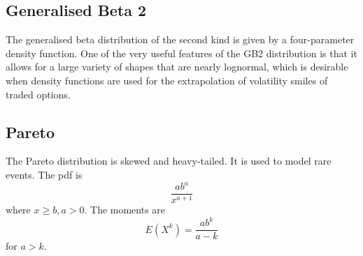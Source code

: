 \subsection{Generalised Beta 2}
The generalised beta distribution of the second kind
is given by a four-parameter density function. One of the very useful features of the GB2 distribution is that it allows for a large variety
of shapes that are nearly lognormal, which is desirable when density functions are used
for the extrapolation of volatility smiles of traded options.
\subsection{Pareto}
The Pareto distribution is skewed and heavy-tailed. It is used to model rare events. The pdf is $$
\frac{ab^a}{x^{a+1}}
$$
where $x \geq b, a > 0$. The moments are $$
E(X^k) = \frac{ab^k}{a-k}
$$
for $a > k$.

